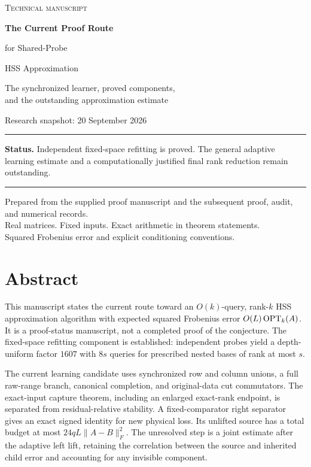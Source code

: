 \documentclass[11pt,oneside,openany,a4paper]{report}
\numberwithin{equation}{chapter}
\theoremstyle{definition}
\theoremstyle{remark}
\begin{document}
\hypersetup{pageanchor=false}
\begin{titlepage}
\vspace*{10mm}
{\color{inkblue}\large\scshape Technical manuscript\par}
\vspace{17mm}
{\color{inkblue}\Huge\bfseries The Current Proof Route\par for Shared-Probe\par HSS Approximation\par}
\vspace{9mm}
{\Large\raggedright The synchronized learner, proved components,\\ and the outstanding approximation estimate\par}
\vspace{13mm}
{\large Research snapshot: 20 September 2026\par}
\vspace{15mm}
\hrule\vspace{5mm}
\textbf{Status.} Independent fixed-space refitting is proved. The general adaptive learning estimate and a computationally justified final rank reduction remain outstanding.
\vspace{5mm}\hrule
\vfill
Prepared from the supplied proof manuscript and the subsequent proof,
audit, and numerical records.\\[4pt]
Real matrices. Fixed inputs. Exact arithmetic in theorem statements.\\
Squared Frobenius error and explicit conditioning conventions.
\end{titlepage}
\hypersetup{pageanchor=true}
\chapter*{Abstract}
This manuscript states the current route toward an $O(k)$-query, rank-$k$ HSS approximation algorithm with expected squared Frobenius error $O(L)\operatorname{OPT}_k(A)$. It is a proof-status manuscript, not a completed proof of the conjecture. The fixed-space refitting component is established: independent probes yield a depth-uniform factor $1607$ with $8s$ queries for prescribed nested bases of rank at most $s$.

The current learning candidate uses synchronized row and column unions, a full raw-range branch, canonical completion, and original-data cut commutators. The exact-input capture theorem, including an enlarged exact-rank endpoint, is separated from residual-relative stability. A fixed-comparator right separator gives an exact signed identity for new physical loss. Its unlifted source has a total budget at most $24qL\|A-B\|_F^2$. The unresolved step is a joint estimate after the adaptive left lift, retaining the correlation between the source and inherited child error and accounting for any invisible component.
\end{document}
